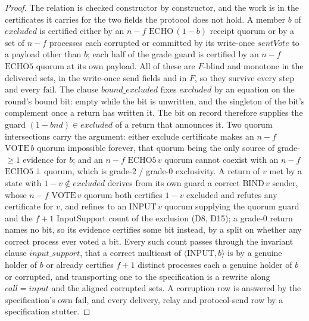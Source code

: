 \begin{proof}\leanok
  The relation is checked constructor by constructor, and the work is in the certificates it carries for the two fields the protocol does not hold.
  A member $b$ of $excluded$ is certified either by an $n{-}f$ $\mathrm{ECHO}\,(1-b)$ receipt quorum or by a set of $n{-}f$ processes each corrupted or committed by its write-once $\mathit{sentVote}$ to a payload other than $b$; each half of the grade guard is certified by an $n{-}f$ $\mathrm{ECHO5}$ quorum at its own payload.
  All of these are $F$-blind and monotone in the delivered sets, in the write-once send fields and in $F$, so they survive every step and every $\mathrm{fail}$.
  The clause $bound\_excluded$ fixes $excluded$ by an equation on the round's bound bit: empty while the bit is unwritten, and the singleton of the bit's complement once a return has written it.
  The bit on record therefore supplies the guard $(1-bnd) \in excluded$ of a return that announces it.
  Two quorum intersections carry the argument: either exclude certificate makes an $n{-}f$ $\mathrm{VOTE}\,b$ quorum impossible forever, that quorum being the only source of grade-$\ge 1$ evidence for $b$; and an $n{-}f$ $\mathrm{ECHO5}\,v$ quorum cannot coexist with an $n{-}f$ $\mathrm{ECHO5}\,\bot$ quorum, which is grade-2 / grade-0 exclusivity.
  A return of $v$ met by a state with $1-v \notin excluded$ derives from its own guard a correct $\mathrm{BIND}\,v$ sender, whose $n{-}f$ $\mathrm{VOTE}\,v$ quorum both certifies $1-v$ excluded and refutes any certificate for $v$, and refines to an $\mathrm{INPUT}\,v$ quorum supplying the quorum guard and the $f{+}1$ $\mathrm{InputSupport}$ count of the exclusion (D8, D15); a grade-0 return names no bit, so its evidence certifies some bit instead, by a split on whether any correct process ever voted a bit.
  Every such count passes through the invariant clause $input\_support$, that a correct multicast of $\langle\mathrm{INPUT},b\rangle$ is by a genuine holder of $b$ or already certifies $f{+}1$ distinct processes each a genuine holder of $b$ or corrupted, and transporting one to the specification is a rewrite along $call = \mathit{input}$ and the aligned corrupted sets.
  A corruption row is answered by the specification's own $\mathrm{fail}$, and every delivery, relay and protocol-send row by a specification stutter.
\end{proof}

